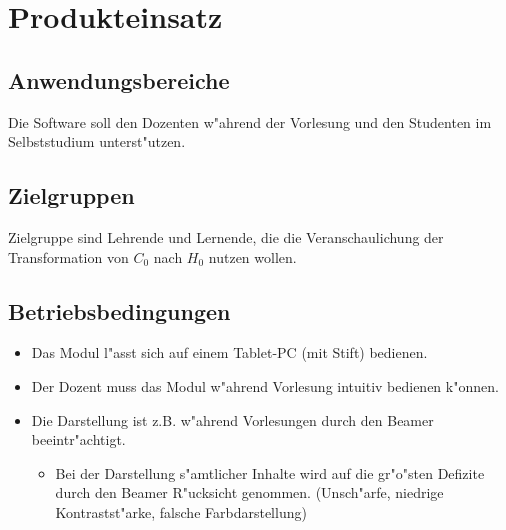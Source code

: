 \section{Produkteinsatz}


\subsection{Anwendungsbereiche}

Die Software soll den Dozenten w"ahrend der Vorlesung und den Studenten im
Selbststudium unterst"utzen.

\subsection{Zielgruppen}
Zielgruppe sind Lehrende und Lernende, die die Veranschaulichung der Transformation von $C_0$ nach $H_0$ nutzen wollen.


\subsection{Betriebsbedingungen}
\begin{itemize}
  \item Das Modul l"asst sich auf einem Tablet-PC (mit Stift) bedienen.
  \item Der Dozent muss das Modul w"ahrend Vorlesung intuitiv bedienen k"onnen.
  \item Die Darstellung ist z.B. w"ahrend Vorlesungen durch den Beamer
  beeintr"achtigt.
  \begin{itemize}
    \item Bei der Darstellung s"amtlicher Inhalte wird auf die gr"o"sten Defizite durch den Beamer R"ucksicht genommen. (Unsch"arfe, niedrige Kontrastst"arke, falsche Farbdarstellung)
  \end{itemize}
\end{itemize}
